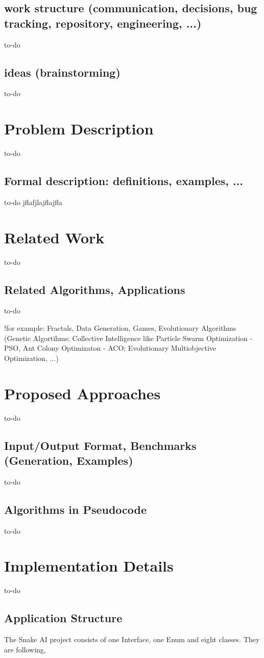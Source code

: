 \documentclass[a4paper,12pt]{article}
\begin{document}
\subsection{work structure (communication, decisions, bug tracking, repository, engineering, ...)}
to-do

\subsection{ideas (brainstorming)}
to-do

\section{Problem Description}
to-do
\subsection{Formal description: definitions, examples, ...}
to-do
jflafjlajflajfla
\section{Related Work}
to-do
\subsection{Related Algorithms, Applications}
to-do

!for example: Fractals, Data Generation, Games, Evolutionary Algorithms (Genetic Algortihms; Collective Intelligence like Particle Swarm Optimization - PSO, Ant Colony Optimizaton - ACO; Evolutionary Multiobjective Optimization, ...)

\section{Proposed Approaches}
to-do
\subsection{Input/Output Format, Benchmarks (Generation, Examples)}
to-do
\subsection{Algorithms in Pseudocode}
to-do

\section{Implementation Details}
to-do
\subsection{Application Structure}
The Snake AI project consists of one Interface, one Enum and eight classes. They are following, 
\end{document}
